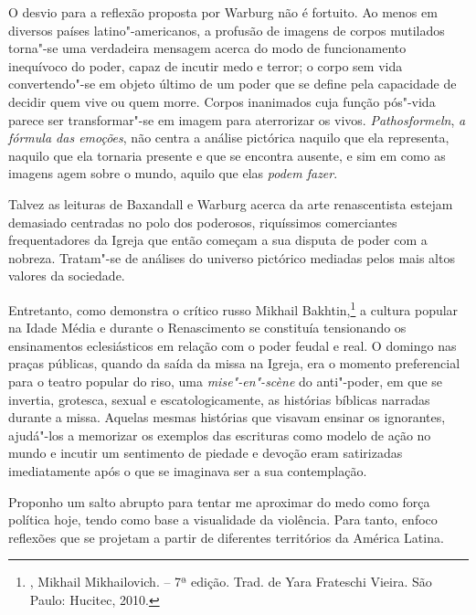 O desvio para a reflexão proposta por Warburg não é fortuito. Ao menos
em diversos países latino"-americanos, a profusão de imagens de corpos
mutilados torna"-se uma verdadeira mensagem acerca do modo de
funcionamento inequívoco do poder, capaz de incutir medo e terror; o
corpo sem vida convertendo"-se em objeto último de um poder que se define
pela capacidade de decidir quem vive ou quem morre. Corpos inanimados
cuja função pós"-vida parece ser transformar"-se em imagem para
aterrorizar os vivos. \emph{Pathosformeln}, \emph{a fórmula das
emoções}, não centra a análise pictórica naquilo que ela representa,
naquilo que ela tornaria presente e que se encontra ausente, e sim em
como as imagens agem sobre o mundo, aquilo que elas \emph{podem fazer}.

\asterisc

Talvez as leituras de Baxandall e Warburg acerca da arte renascentista
estejam demasiado centradas no polo dos poderosos, riquíssimos
comerciantes frequentadores da Igreja que então começam a sua disputa de
poder com a nobreza. Tratam"-se de análises do universo pictórico
mediadas pelos mais altos valores da sociedade.

Entretanto, como demonstra o crítico russo Mikhail Bakhtin,\footnote{, Mikhail Mikhailovich. {} -- 7ª edição. Trad. de Yara Frateschi Vieira. São Paulo: Hucitec, 2010.} a cultura
popular na Idade Média e durante o Renascimento se constituía
tensionando os ensinamentos eclesiásticos em relação com o poder feudal
e real. O domingo nas praças públicas, quando da saída da missa na
Igreja, era o momento preferencial para o teatro popular do riso, uma
\emph{mise"-en"-scène} do anti"-poder, em que se invertia, grotesca, sexual e
escatologicamente, as histórias bíblicas narradas
durante a missa. Aquelas mesmas histórias que visavam ensinar os ignorantes,
ajudá"-los a memorizar os exemplos das escrituras como modelo de ação no
mundo e incutir um sentimento de piedade e devoção eram satirizadas
imediatamente após o que se imaginava ser a sua contemplação.

\asterisc

Proponho um salto abrupto para tentar me aproximar do medo como força política hoje,
tendo como base a visualidade da violência. Para tanto, enfoco reflexões
que se projetam a partir de diferentes territórios da América Latina.

